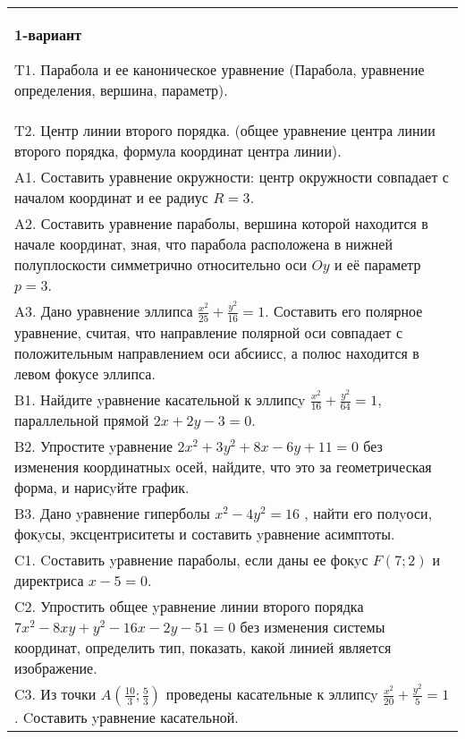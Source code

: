 \documentclass{article}
\begin{document}
\large
{}


\begin{tabular}{m{17cm}}
\textbf{1-вариант}
\newline

T1. Парабола и ее каноническое уравнение (Парабола, уравнение определения, вершина, параметр).\\

T2. Центр линии второго порядка. (общее уравнение центра линии второго порядка, формула координат центра линии).\\

A1. Составить уравнение окружности: центр окружности совпадает с началом координат и ее радиус $R=3$.\\

A2. Составить уравнение параболы, вершина которой находится в начале координат, зная, что парабола расположена в нижней полуплоскости симметрично относительно оси $Oy$ и её параметр $p=3$.\\

A3. Дано уравнение эллипса $\frac{x^2}{25}+\frac{y^2}{16}=1$. Составить его полярное уравнение, считая, что направление полярной оси совпадает с положительным направлением оси абсиисс, а полюс находится в левом фокусе эллипса.\\

B1. Найдите yравнение касательной к эллипсy $\frac{x^{2}}{16} + \frac{y^{2}}{64} = 1$, параллельной прямой $2x + 2y - 3 = 0$.  \\

B2. Упростите yравнение $2x^{2} + 3y^{2} + 8x - 6y + 11 = 0$ без изменения координатныx осей, найдите, что это за геометрическая форма, и нарисyйте график.  \\

B3. Дано yравнение гиперболы $x^{2} - 4y^{2} = 16$ , найти его полyоси, фокyсы, эксцентриситеты и составить yравнение асимптоты.\\

C1. Cоставить yравнение параболы, если даны ее фокyс $F(7;2)$ и директриса $x-5=0$.  \\

C2. Упростить общее yравнение линии второго порядка $7x^{2}-8xy+y^{2}-16x-2y-51=0$ без изменения системы координат, определить тип, показать, какой линией является изображение.\\

C3. Из точки $A(\frac{10}{3};\frac{5}{3})$ проведены касательные к эллипсy $\frac{x^{2}}{20}+\frac{y^{2}}{5}=1$ . Cоставить yравнение касательной.  \\

\end{tabular}
\vspace{1cm}
\end{document}
